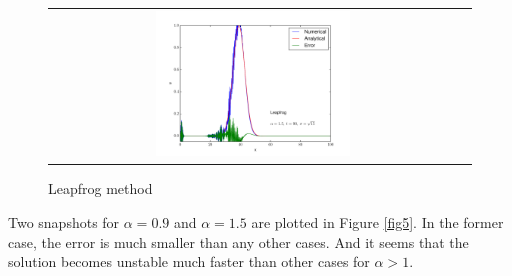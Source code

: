 \documentclass[11pt,letterpaper]{article}
\begin{document}
\begin{figure}[bth]
\begin{tabular}{cc}
    \includegraphics[width={0.49\textwidth}]{fig10.pdf} \\
\end{tabular}
\caption{Leapfrog method}
\label{fig4}
\end{figure}

Two snapshots for $\alpha=0.9$ and $\alpha=1.5$ are plotted in Figure \ref{fig5}. In the former case, the error is much smaller than any other cases. And it seems that the solution becomes unstable much faster than other cases for $\alpha>1$.
\end{document}
